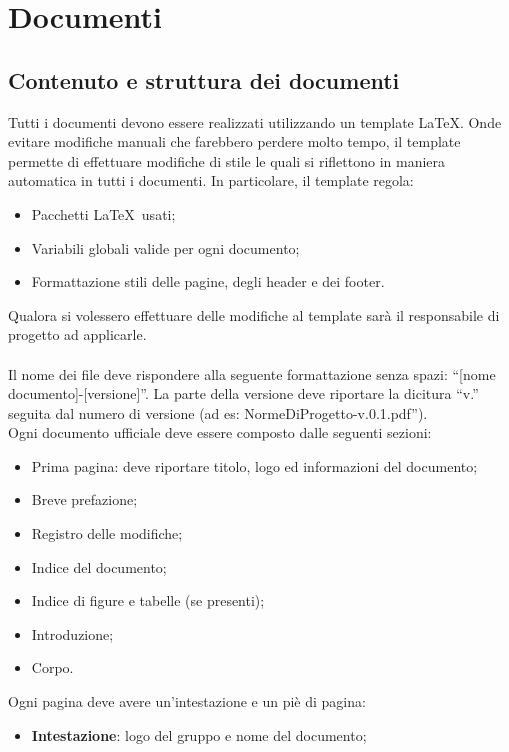 \section{Documenti}{
	\label{sec:docs}
	\subsection{Contenuto e struttura dei documenti}{
		\label{sub:content}
		Tutti i documenti devono essere realizzati utilizzando un template \LaTeX. Onde evitare modifiche manuali che farebbero perdere molto tempo, il template permette di effettuare modifiche di stile le quali si riflettono in maniera automatica in tutti i documenti. In particolare, il template regola:
		\begin{itemize}
			\item Pacchetti \LaTeX\ usati;
			\item Variabili globali valide per ogni documento;
			\item Formattazione stili delle pagine, degli header e dei footer.
		\end{itemize}
		Qualora si volessero effettuare delle modifiche al template sar\`{a} il responsabile di progetto ad applicarle.\\
		\\
		Il nome dei file deve rispondere alla seguente formattazione senza spazi: “[nome documento]-[versione]”. La parte della versione deve riportare la dicitura “v.” seguita dal numero di versione (ad es: NormeDiProgetto-v.0.1.pdf”).\\
		Ogni documento ufficiale deve essere composto dalle seguenti sezioni:
		\begin{itemize}
			\item Prima pagina: deve riportare titolo, logo ed informazioni del documento;
			\item Breve prefazione;
			\item Registro delle modifiche;
			\item Indice del documento;
			\item Indice di figure e tabelle (se presenti);
			\item Introduzione;
			\item Corpo.
		\end{itemize}
		Ogni pagina deve avere un'intestazione e un pi\`{e} di pagina:
		\begin{itemize}
			\item \textbf{Intestazione}: logo del gruppo e nome del documento;

\end{itemize}}}
